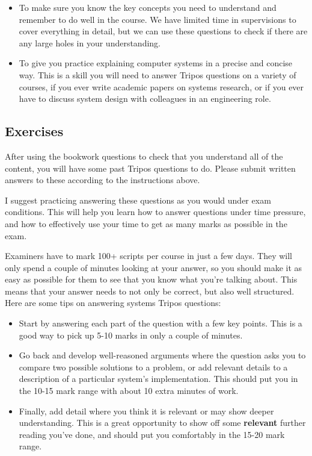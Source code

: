 \documentclass[12pt,a4paper,oneside,openright]{report}
\begin{document}
\begin{itemize}
\item To make sure you know the key concepts you need to understand
  and remember to do well in the course. We have limited time in
  supervisions to cover everything in detail, but we can use these
  questions to check if there are any large holes in your
  understanding.
\item To give you practice explaining computer systems in a precise
  and concise way. This is a skill you will need to answer Tripos
  questions on a variety of courses, if you ever write academic papers
  on systems research, or if you ever have to discuss system design
  with colleagues in an engineering role.
\end{itemize}

  
\subsection*{Exercises}

After using the bookwork questions to check that you understand all of
the content, you will have some past Tripos questions to do. Please
submit written answers to these according to the instructions above.

I suggest practicing answering these questions as you would under exam
conditions. This will help you learn how to answer questions under
time pressure, and how to effectively use your time to get as many
marks as possible in the exam.

Examiners have to mark 100+ scripts per course in just a few
days. They will only spend a couple of minutes looking at your answer,
so you should make it as easy as possible for them to see that you
know what you're talking about. This means that your answer needs to
not only be correct, but also well structured. Here are some tips on
answering systems Tripos questions:

\begin{itemize}
\item Start by answering each part of the question with a few key
  points. This is a good way to pick up 5-10 marks in only a couple of
  minutes.
\item Go back and develop well-reasoned arguments where the question
  asks you to compare two possible solutions to a problem, or add
  relevant details to a description of a particular system's
  implementation. This should put you in the 10-15 mark range with
  about 10 extra minutes of work.
\item Finally, add detail where you think it is relevant or may show
  deeper understanding. This is a great opportunity to show off some
  \textbf{relevant} further reading you've done, and should put you
  comfortably in the 15-20 mark range.
\end{itemize}
\end{document}
